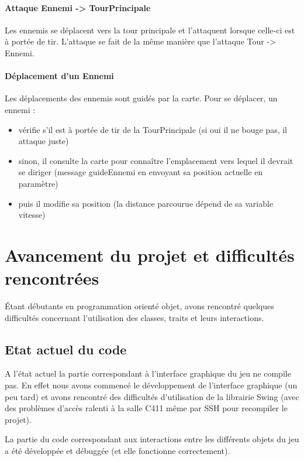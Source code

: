 \documentclass{article}
\begin{document}
\paragraph{Attaque Ennemi -> TourPrincipale}

Les ennemis se déplacent vers la tour principale et l'attaquent lorsque celle-ci est à portée de tir. L'attaque se fait de la même manière que l'attaque Tour -> Ennemi.

\paragraph{Déplacement d'un Ennemi}

Les déplacements des ennemis sont guidés par la carte. Pour se déplacer, un ennemi :

\begin{itemize}
  \item vérifie s'il est à portée de tir de la TourPrincipale (si oui il ne bouge pas, il attaque juste)
  \item sinon, il consulte la carte pour connaître l'emplacement vers lequel il devrait se diriger (message guideEnnemi en envoyant sa position actuelle en paramètre)
  \item puis il modifie sa position (la distance parcourue dépend de sa variable vitesse)
\end{itemize}


\section{Avancement du projet et difficultés rencontrées}

Étant débutants en programmation orienté objet, avons rencontré quelques difficultés concernant l'utilisation des classes, traits et leurs interactions.\\

\subsection{Etat actuel du code}

A l'état actuel la partie correspondant à l'interface graphique du jeu ne compile pas. En effet nous avons commencé le développement de l'interface graphique (un peu tard) et avons rencontré des difficultés d'utilisation de la librairie Swing (avec des problèmes d'accès ralenti à la salle C411 même par SSH pour recompiler le projet).

La partie du code correspondant aux interactions entre les différents objets du jeu a été développée et débuggée (et elle fonctionne correctement).
\end{document}
